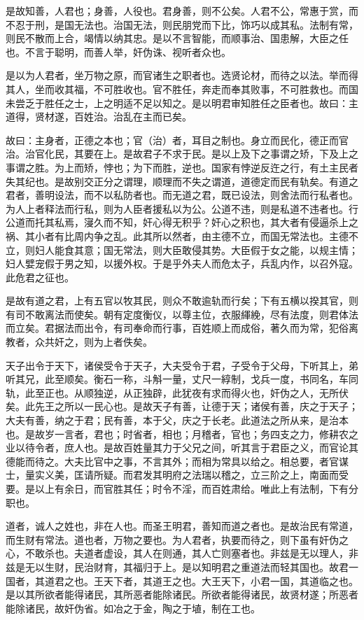 \documentclass[]{article}
\begin{document}
是故知善，人君也；身善，人役也。君身善，则不公矣。人君不公，常惠于赏，而不忍于刑，是国无法也。治国无法，则民朋党而下比，饰巧以成其私。法制有常，则民不散而上合，竭情以纳其忠。是以不言智能，而顺事治、国患解，大臣之任也。不言于聪明，而善人举，奸伪诛、视听者众也。

是以为人君者，坐万物之原，而官诸生之职者也。选贤论材，而待之以法。举而得其人，坐而收其福，不可胜收也。官不胜任，奔走而奉其败事，不可胜救也。而国未尝乏于胜任之士，上之明适不足以知之。是以明君审知胜任之臣者也。故曰：主道得，贤材遂，百姓治。治乱在主而已矣。

故曰：主身者，正德之本也；官（治）者，耳目之制也。身立而民化，德正而官治。治官化民，其要在上。是故君子不求于民。是以上及下之事谓之矫，下及上之事谓之胜。为上而矫，悖也；为下而胜，逆也。国家有悖逆反迕之行，有土主民者失其纪也。是故别交正分之谓理，顺理而不失之谓道，道德定而民有轨矣。有道之君者，善明设法，而不以私防者也。而无道之君，既已设法，则舍法而行私者也。为人上者释法而行私，则为人臣者援私以为公。公道不违，则是私道不违者也。行公道而托其私焉，寖久而不知，奸心得无积乎？奸心之积也，其大者有侵逼杀上之祸、其小者有比周内争之乱。此其所以然者，由主德不立，而国无常法也。主德不立，则妇人能食其意；国无常法，则大臣敢侵其势。大臣假于女之能，以规主情；妇人嬖宠假于男之知，以援外权。于是乎外夫人而危太子，兵乱内作，以召外寇。此危君之征也。

是故有道之君，上有五官以牧其民，则众不敢逾轨而行矣；下有五横以揆其官，则有司不敢离法而使矣。朝有定度衡仪，以尊主位，衣服緷絻，尽有法度，则君体法而立矣。君据法而出令，有司奉命而行事，百姓顺上而成俗，著久而为常，犯俗离教者，众共奸之，则为上者佚矣。

天子出令于天下，诸侯受令于天子，大夫受令于君，子受令于父母，下听其上，弟听其兄，此至顺矣。衡石一称，斗斛一量，丈尺一綧制，戈兵一度，书同名，车同轨，此至正也。从顺独逆，从正独辟，此犹夜有求而得火也，奸伪之人，无所伏矣。此先王之所以一民心也。是故天子有善，让德于天；诸侯有善，庆之于天子；大夫有善，纳之于君；民有善，本于父，庆之于长老。此道法之所从来，是治本也。是故岁一言者，君也；时省者，相也；月稽者，官也；务四支之力，修耕农之业以待令者，庶人也。是故百姓量其力于父兄之间，听其言于君臣之义，而官论其德能而待之。大夫比官中之事，不言其外；而相为常具以给之。相总要，者官谋士，量实义美，匡请所疑。而君发其明府之法瑞以稽之，立三阶之上，南面而受要。是以上有余日，而官胜其任；时令不淫，而百姓肃给。唯此上有法制，下有分职也。

道者，诚人之姓也，非在人也。而圣王明君，善知而道之者也。是故治民有常道，而生财有常法。道也者，万物之要也。为人君者，执要而待之，则下虽有奸伪之心，不敢杀也。夫道者虚设，其人在则通，其人亡则塞者也。非兹是无以理人，非兹是无以生财，民治财育，其福归于上。是以知明君之重道法而轻其国也。故君一国者，其道君之也。王天下者，其道王之也。大王天下，小君一国，其道临之也。是以其所欲者能得诸民，其所恶者能除诸民。所欲者能得诸民，故贤材遂；所恶者能除诸民，故奸伪省。如冶之于金，陶之于埴，制在工也。
\end{document}
